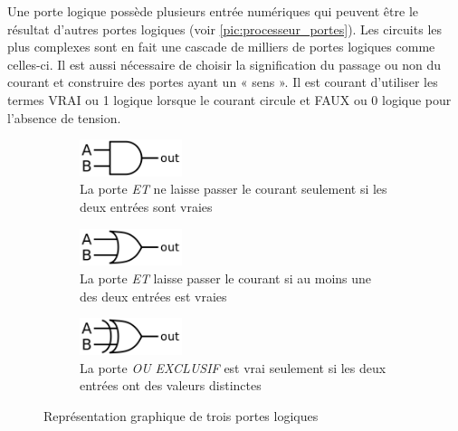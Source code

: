 Une porte logique possède plusieurs entrée numériques qui peuvent être le résultat d'autres portes logiques (voir \autoref{pic:processeur_portes}). Les circuits les plus complexes sont en fait une cascade de milliers de portes logiques comme celles-ci. Il est aussi nécessaire de choisir la signification du passage ou non du courant et construire des portes ayant un « sens ». Il est courant d'utiliser les termes VRAI ou 1 logique lorsque le courant circule et FAUX ou 0 logique pour l'absence de tension.


\begin{figure}
\begin{subfigure}{.3\textwidth}
\centering
\includegraphics[width=3cm]{images/processeur_porte_et.png}
\caption{La porte \textit{ET} ne laisse passer le courant seulement si les deux entrées sont vraies}
\end{subfigure}\hfill
\begin{subfigure}{.3\textwidth}
\centering
\includegraphics[width=3cm]{images/processeur_porte_ou.png}
\caption{La porte \textit{ET} laisse passer le courant si au moins une des deux entrées est vraies}
\end{subfigure}\hfill
\begin{subfigure}{.3\textwidth}
\centering
\includegraphics[width=3cm]{images/processeur_porte_oux.png}
\caption{La porte \textit{OU EXCLUSIF} est vrai seulement si les deux entrées ont des valeurs distinctes}
\end{subfigure}
\caption{Représentation graphique de trois portes logiques \cite{Wikipedia2019Porte}}
\label{pic:processeur_portes}
\end{figure}




